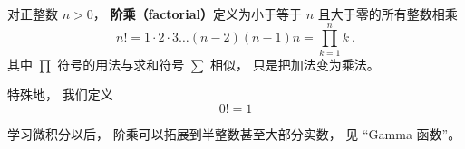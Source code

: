 
\begin{issues}
\issueDraft
\end{issues}

对正整数 $n > 0$， \textbf{阶乘（factorial）}定义为小于等于 $n$ 且大于零的所有整数相乘
\begin{equation}
n! = 1 \cdot 2 \cdot 3 \dots (n - 2) (n - 1)n = \prod_{k = 1}^n k~.
\end{equation}
其中 $\prod$ 符号的用法与求和符号 $\sum$ 相似， 只是把加法变为乘法。 %

特殊地， 我们定义
\begin{equation}
0! = 1
\end{equation}

学习微积分以后， 阶乘可以拓展到半整数甚至大部分实数， 见 “Gamma 函数”。
